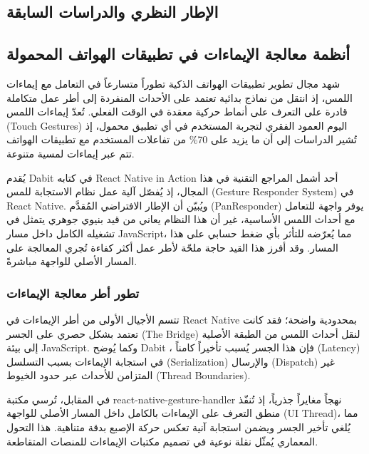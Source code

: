\begin{Arabic}
\chapter{الإطار النظري والدراسات السابقة}
\clearpage

\section{أنظمة معالجة الإيماءات في تطبيقات الهواتف المحمولة}

شهد مجال تطوير تطبيقات الهواتف الذكية تطوراً متسارعاً في التعامل مع إيماءات اللمس، إذ انتقل من نماذج بدائية تعتمد على الأحداث المنفردة إلى أطر عمل متكاملة قادرة على التعرف على أنماط حركية معقدة في الوقت الفعلي. تُعدّ إيماءات اللمس (Touch Gestures) اليوم العمود الفقري لتجربة المستخدم في أي تطبيق محمول، إذ تُشير الدراسات إلى أن ما يزيد على 70\% من تفاعلات المستخدم مع تطبيقات الهواتف تتم عبر إيماءات لمسية متنوعة.

يُقدم \textenglish{Dabit} \cite{dabit2019} في كتابه \textenglish{React Native in Action} أحد أشمل المراجع التقنية في هذا المجال، إذ يُفصّل آلية عمل نظام الاستجابة للمس (\textenglish{Gesture Responder System}) في \textenglish{React Native}. ويُبيّن أن الإطار الافتراضي المُقدَّم (\textenglish{PanResponder}) يوفر واجهة للتعامل مع أحداث اللمس الأساسية، غير أن هذا النظام يعاني من قيد بنيوي جوهري يتمثل في تشغيله الكامل داخل مسار \textenglish{JavaScript}، مما يُعرّضه للتأثر بأي ضغط حسابي على هذا المسار. وقد أفرز هذا القيد حاجة ملحّة لأطر عمل أكثر كفاءة تُجري المعالجة على المسار الأصلي للواجهة مباشرةً.

\subsection{تطور أطر معالجة الإيماءات}

تتسم الأجيال الأولى من أطر الإيماءات في \textenglish{React Native} بمحدودية واضحة؛ فقد كانت تعتمد بشكل حصري على الجسر (\textenglish{The Bridge}) لنقل أحداث اللمس من الطبقة الأصلية إلى بيئة \textenglish{JavaScript}. وكما يُوضح \textenglish{Dabit} \cite{dabit2019}، فإن هذا الجسر يُسبب تأخيراً كامناً (\textenglish{Latency}) في استجابة الإيماءات بسبب التسلسل (\textenglish{Serialization}) والإرسال (\textenglish{Dispatch}) غير المتزامن للأحداث عبر حدود الخيوط (\textenglish{Thread Boundaries}).

في المقابل، تُرسي مكتبة \textenglish{react-native-gesture-handler} نهجاً مغايراً جذرياً، إذ تُنفّذ منطق التعرف على الإيماءات بالكامل داخل المسار الأصلي للواجهة (\textenglish{UI Thread})، مما يُلغي تأخير الجسر ويضمن استجابة آنية تعكس حركة الإصبع بدقة متناهية. هذا التحول المعماري يُمثّل نقلة نوعية في تصميم مكتبات الإيماءات للمنصات المتقاطعة.


\end{Arabic}

